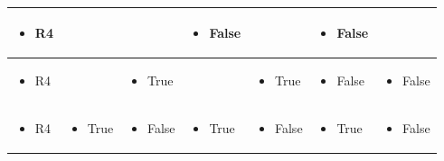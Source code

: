 \documentclass[11pt,a4paper]{article}
\begin{document}
\begin{table}[h]
\begin{tabular}{|l|l|l|l|l|l|l|}
\begin{itemize} \item R4 \end{itemize} &  &  & \begin{itemize} \item False \end{itemize} &  & \begin{itemize} \item False \end{itemize} &  \\ \hline
\begin{itemize} \item R4 \end{itemize} &  & \begin{itemize} \item True \end{itemize} &  & \begin{itemize} \item True \end{itemize} & \begin{itemize} \item False \end{itemize} & \begin{itemize} \item False \end{itemize} \\ \hline
\begin{itemize} \item R4 \end{itemize} & \begin{itemize} \item True \end{itemize} & \begin{itemize} \item False \end{itemize} & \begin{itemize} \item True \end{itemize} & \begin{itemize} \item False \end{itemize} & \begin{itemize} \item True \end{itemize} & \begin{itemize} \item False \end{itemize} \\ \hline
\end{tabular}
\end{table}
\end{document}
